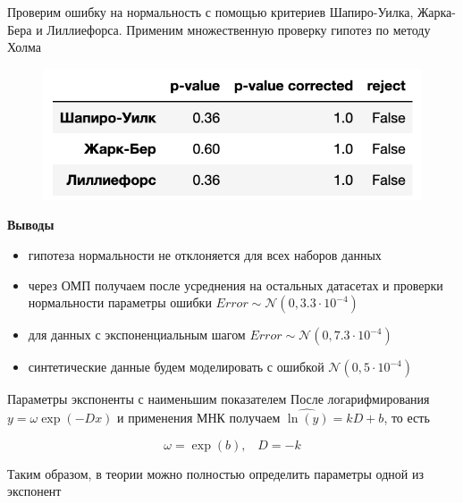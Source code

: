 \documentclass{beamer}      %
\begin{document}
\begin{frame}
    Проверим ошибку на нормальность с помощью критериев Шапиро-Уилка, Жарка-Бера и Лиллиефорса.
    Применим множественную проверку гипотез по методу Холма

    \begin{figure}[ht]
        \includegraphics[width=1.0\textwidth]{Таблица1}
    \end{figure}

\end{frame}



\begin{frame}[fragile]
    \textbf{Выводы}

    \begin{itemize}
        \item гипотеза нормальности не отклоняется для всех наборов данных
        \item через ОМП получаем после усреднения на остальных датасетах и проверки нормальности
        параметры ошибки  $Error \sim \mathcal{N}(0, 3.3\cdot 10^{-4})$
        \item для данных с экспоненциальным шагом $Error \sim \mathcal{N}(0, 7.3\cdot 10^{-4})$
        \item синтетические данные будем моделировать с ошибкой $\mathcal{N}(0, 5\cdot 10^{-4})$
    \end{itemize}
\end{frame}

\begin{frame}[fragile]{Параметры экспоненты с наименьшим показателем}
    После логарифмирования $y = \omega \exp(-D x)$ и применения МНК получаем
    $\hat{\ln(y)} = kD + b$, то есть

    \begin{equation}
        \omega = \exp(b), \;\;\; D = -k
    \end{equation}

    Таким образом, в теории можно полностью определить параметры одной из экспонент

    \hspace{1pt}

\end{frame}
\end{document}
